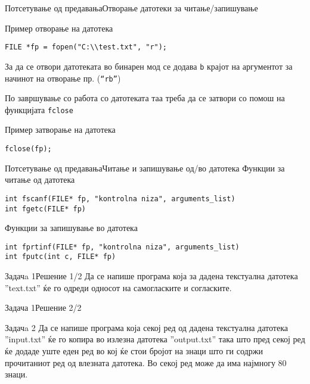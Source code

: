 \begin{frame}[fragile]{Потсетување од предавања}{Отворање датотеки за
читање/запишување}

\begin{exampleblock}{Пример отворање на датотека}
\begin{lstlisting}
FILE *fp = fopen("C:\\test.txt", "r");
\end{lstlisting}
\begin{scriptsize}
За да се отвори датотеката во бинарен мод се додава \texttt{b} крајот на
аргументот за начинот на отворање пр. (\texttt{``rb''})
\end{scriptsize}
\end{exampleblock}
По завршување со работа со датотеката таа треба да се затвори со помош на
функцијата \texttt{fclose}
\begin{exampleblock}{Пример затворање на датотека}
\begin{lstlisting}
fclose(fp);
\end{lstlisting}
\end{exampleblock}
\end{frame}

\begin{frame}[fragile]{Потсетување од предавања}{Читање и запишување од/во
датотека}
Функции за читање од датотека
\begin{lstlisting}
int fscanf(FILE* fp, "kontrolna niza", arguments_list)
int fgetc(FILE* fp)
\end{lstlisting}

Функции за запишување во датотека
\begin{lstlisting}
int fprtinf(FILE* fp, "kontrolna niza", arguments_list)
int fputc(int c, FILE* fp)
\end{lstlisting}

\end{frame}


\begin{frame}[fragile]{Задачa 1}{Решение 1/2}
Да се напише програма која за дадена текстуална датотека ''text.txt'' ќе го одреди односот на
самогласките и согласките.

\end{frame}

\begin{frame}[fragile]{Задача 1}{Решение 2/2}

\end{frame}

\begin{frame}{Задачa 2}
Да се напише програма која секој ред од дадена текстуална датотека ''input.txt'' ќе го копира
во излезна датотека ''output.txt'' така што пред секој ред ќе додаде уште еден ред во кој ќе
стои бројот на знаци што ги содржи прочитаниот ред од влезната датотека. Во секој
ред може да има најмногу 80 знаци.
\end{frame}

